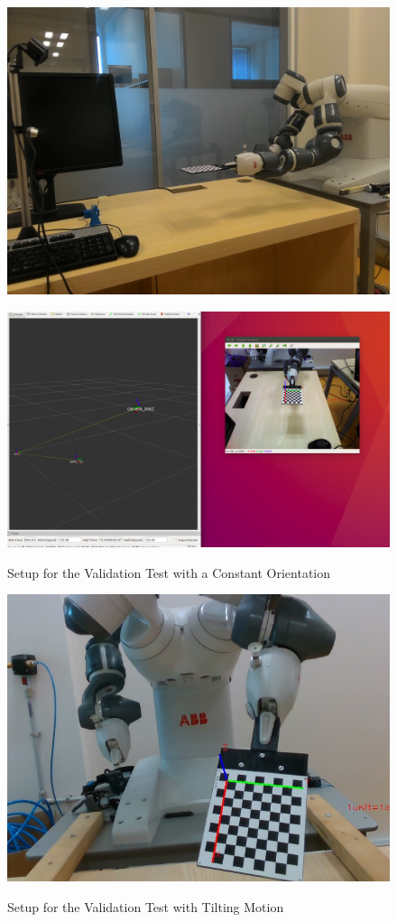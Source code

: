 \begin{figure}[htp]
\begin{center}
{
  \includegraphics[clip,width=0.6\columnwidth]{images/ext1.jpg}
}
\end{center}
\begin{center}
{
  \includegraphics[clip,width=0.6\columnwidth]{images/ext2.jpg}
}
\end{center}
\caption{Setup for the Validation Test with a Constant Orientation}
\label{setupext}
\end{figure}



\begin{figure}[htp]
\begin{center}
{
  \includegraphics[clip,width=0.6\columnwidth]{images/ext3.jpg}
}
\end{center}
\caption{Setup for the Validation Test with Tilting Motion}
\label{setupext}
\end{figure}
